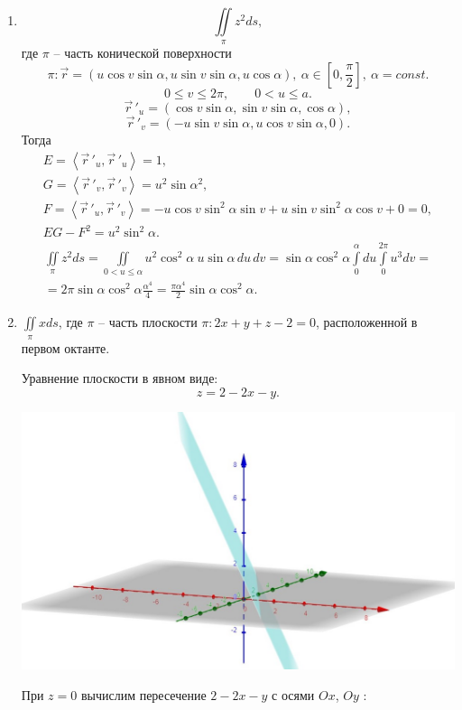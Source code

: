 \documentclass[../../main.tex]{subfiles}
\begin{document}
	\begin{exmps}
	
	\,
	
	\begin{enumerate}
	\item
	\[ \iint \limits_\pi z^2 ds,\] где $\pi$ \--- часть конической 
	поверхности
	\[\pi: \vec{r} = (u\cos v\sin \alpha, u\sin v\sin\alpha, 
	u\cos\alpha) , \ 
	  \alpha\in \left[0, \frac{\pi}{2}\right], \ \alpha = const.\] 
	\[0 \leq v \leq 2\pi, \qquad 0 < u \leq a. \]
	\[\vec r\,'_u = (\cos v \sin \alpha, \sin v \sin \alpha, \cos \alpha), \]
	\[\vec r\,'_v = (-u \sin v \sin \alpha, u \cos v \sin \alpha, 0).  \]
	Тогда
	\begin{gather*}
	E = \left<\vec r\,'_u, \vec r\,'_u\right>= 1, \\ G = \left<\vec r\,'_v, \vec 
	r\,'_v\right> = u^2 \sin \alpha^2, \\
	F = \left<\vec r\,'_u, \vec r\,'_v\right> = -u \cos v \sin^2 \alpha \sin 
	v +
	 u \sin v \sin ^2 \alpha \cos v+0 =0, \\
	EG - F^2 = u^2 \sin^2 \alpha.
	\end{gather*}
	\begin{gather*}
	\iint \limits_\pi z^2 ds = \iint\limits_{0<u \leq \alpha} u^2 \cos^2 \alpha
	 \ u \sin \alpha \,du\, dv = \sin \alpha \cos ^2 \alpha \int \limits_0^\alpha 
	 du
	  \int \limits_0 ^{2\pi} u^3 dv = \\ = 2 \pi \sin \alpha \cos ^2 \alpha 
	  \frac{\alpha^4}{4} =
	   \frac{\pi \alpha^4}{2} \sin \alpha \cos^2 \alpha.
	\end{gather*}
	\item 
	$\displaystyle\iint \limits_\pi x ds$, где $\pi$ \--- часть плоскости
	$\pi : 2x+y+z-2=0$, расположенной в первом октанте.
	
	Уравнение плоскости в явном виде:
	\[z = 2 -2x -y.\]
	\begin{center}
	 \includegraphics[scale = 0.2]{lec23-2.jpg}
	\end{center}	
	При $z = 0$ вычислим пересечение $2 -2x-y$ с осями $Ox$, $Oy$ :
	

\end{enumerate}
\end{exmps}
\end{document}
